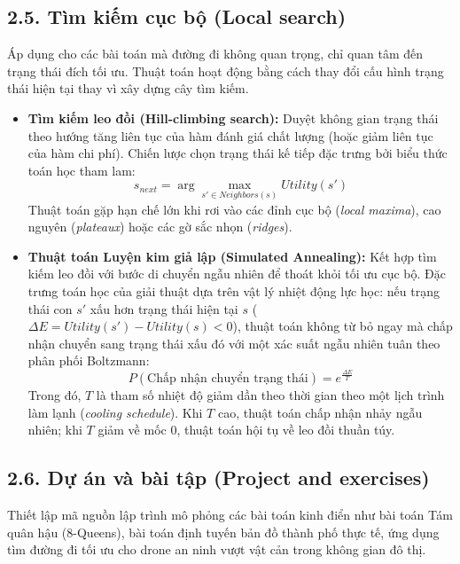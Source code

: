 \documentclass[../main.tex]{subfiles}
\begin{document}
\subsection{2.5. Tìm kiếm cục bộ (Local search)}
Áp dụng cho các bài toán mà đường đi không quan trọng, chỉ quan tâm đến trạng thái đích tối ưu. Thuật toán hoạt động bằng cách thay đổi cấu hình trạng thái hiện tại thay vì xây dựng cây tìm kiếm.
\begin{itemize}
    \item \textbf{Tìm kiếm leo đồi (Hill-climbing search):} Duyệt không gian trạng thái theo hướng tăng liên tục của hàm đánh giá chất lượng (hoặc giảm liên tục của hàm chi phí). Chiến lược chọn trạng thái kế tiếp đặc trưng bởi biểu thức toán học tham lam:
    \begin{equation}
        s_{next} = \arg\max_{s' \in Neighbors(s)} Utility(s')
    \end{equation}
    Thuật toán gặp hạn chế lớn khi rơi vào các đỉnh cục bộ (\textit{local maxima}), cao nguyên (\textit{plateaux}) hoặc các gờ sắc nhọn (\textit{ridges}).
    \item \textbf{Thuật toán Luyện kim giả lập (Simulated Annealing):} Kết hợp tìm kiếm leo đồi với bước di chuyển ngẫu nhiên để thoát khỏi tối ưu cục bộ. Đặc trưng toán học của giải thuật dựa trên vật lý nhiệt động lực học: nếu trạng thái con $s'$ xấu hơn trạng thái hiện tại $s$ ($\Delta E = Utility(s') - Utility(s) < 0$), thuật toán không từ bỏ ngay mà chấp nhận chuyển sang trạng thái xấu đó với một xác suất ngẫu nhiên tuân theo phân phối Boltzmann:
    \begin{equation}
        P(\text{Chấp nhận chuyển trạng thái}) = e^{\frac{\Delta E}{T}}
    \end{equation}
    Trong đó, $T$ là tham số nhiệt độ giảm dần theo thời gian theo một lịch trình làm lạnh (\textit{cooling schedule}). Khi $T$ cao, thuật toán chấp nhận nhảy ngẫu nhiên; khi $T$ giảm về mốc 0, thuật toán hội tụ về leo đồi thuần túy.
\end{itemize}

\subsection{2.6. Dự án và bài tập (Project and exercises)}
Thiết lập mã nguồn lập trình mô phỏng các bài toán kinh điển như bài toán Tám quân hậu (8-Queens), bài toán định tuyến bản đồ thành phố thực tế, ứng dụng tìm đường đi tối ưu cho drone an ninh vượt vật cản trong không gian đô thị.
\end{document}
